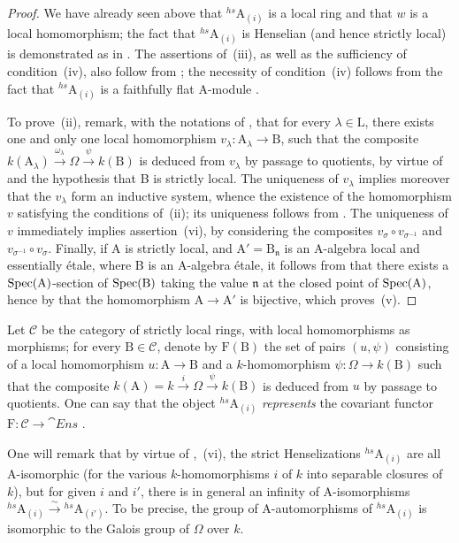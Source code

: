 \begin{proof}
We have already seen above that ${}^{hs}\!\mathrm{A}_{(i)}$ is a local ring and that $w$ is a local homomorphism;
the fact that ${}^{hs}\!\mathrm{A}_{(i)}$ is Henselian (and hence strictly local) is demonstrated as in .
The assertions of~(iii), as well as the sufficiency of condition~(iv), also follow from ; the necessity of condition~(iv) follows from the fact that ${}^{hs}\!\mathrm{A}_{(i)}$ is a faithfully flat A-module .

To prove~(ii), remark, with the notations of , that for every $\lambda\in\mathrm{L}$, there exists one and only one local homomorphism $v_\lambda:\mathrm{A}_\lambda\to\mathrm{B}$, such that the composite $k(\mathrm{A}_\lambda)\xrightarrow{\omega_\lambda}\Omega\xrightarrow{\psi}k(\mathrm{B})$ is deduced from $v_\lambda$ by passage to quotients, by virtue of  and the hypothesis that B is strictly local.
The uniqueness of $v_\lambda$ implies moreover that the $v_\lambda$ form an inductive system, whence the existence of the homomorphism $v$ satisfying the conditions of~(ii); its uniqueness follows from .
The uniqueness of $v$ immediately implies assertion~(vi), by considering the composites $v_\sigma\circ v_{\sigma^{-1}}$ and $v_{\sigma^{-1}}\circ v_\sigma$.
Finally, if A is strictly local, and $\mathrm{A}'=\mathrm{B}_{\mathfrak{n}}$ is an A-algebra local and essentially \'{e}tale, where B is an A-algebra \'{e}tale, it follows from  that there exists a $\operatorname{Spec}(\mathrm{A})$-section of $\operatorname{Spec}(\mathrm{B})$ taking the value $\mathfrak{n}$ at the closed point of $\operatorname{Spec}(\mathrm{A})$, hence by  that the homomorphism $\mathrm{A}\to\mathrm{A}'$ is bijective, which proves~(v).
\end{proof}

\begin{env}[18.8.8.1]
\label{IV.18.8.8.1}
Let $\mathcal{C}$ be the category of strictly local rings, with local homomorphisms as morphisms;
for every $\mathrm{B}\in\mathcal{C}$, denote by $\mathrm{F}(\mathrm{B})$ the set of pairs $(u,\psi)$ consisting of a local homomorphism $u:\mathrm{A}\to\mathrm{B}$ and a $k$-homomorphism $\psi:\Omega\to k(\mathrm{B})$ such that the composite $k(\mathrm{A})=k\xrightarrow{i}\Omega\xrightarrow{\psi}k(\mathrm{B})$ is deduced from $u$ by passage to quotients.
One can say that the object ${}^{hs}\!\mathrm{A}_{(i)}$ \emph{represents} the covariant functor $\mathrm{F}:\mathcal{C}\to\cat{Ens}$ .

One will remark that by virtue of ,~(vi), the strict Henselizations ${}^{hs}\!\mathrm{A}_{(i)}$ are all A-isomorphic (for the various $k$-homomorphisms $i$ of $k$ into separable closures of $k$), but for given $i$ and $i'$, there is in general an infinity of A-isomorphisms ${}^{hs}\!\mathrm{A}_{(i)}\xrightarrow{\sim}{}^{hs}\!\mathrm{A}_{(i')}$.
To be precise, the group of A-automorphisms of ${}^{hs}\!\mathrm{A}_{(i)}$ is isomorphic to the Galois group of $\Omega$ over $k$.
\end{env}

